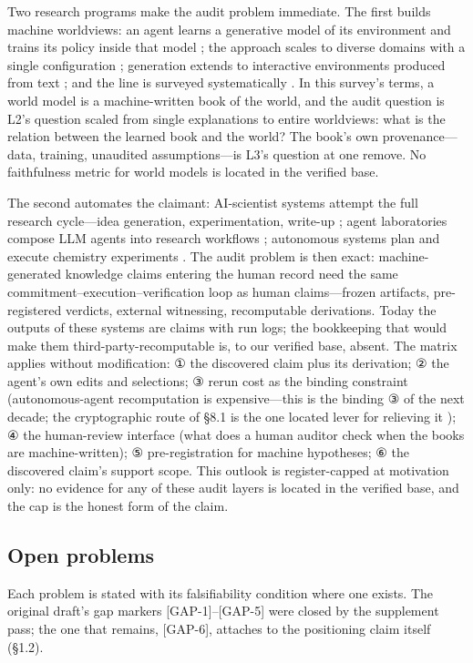 \documentclass[11pt,a4paper]{article}
\begin{document}
Two research programs make the audit problem immediate. The first builds machine worldviews: an agent learns a generative model of its environment and trains its policy inside that model \cite{key49}; the approach scales to diverse domains with a single configuration \cite{key50}; generation extends to interactive environments produced from text \cite{key51}; and the line is surveyed systematically \cite{key52}. In this survey's terms, a world model is a machine-written book of the world, and the audit question is L2's question scaled from single explanations to entire worldviews: what is the relation between the learned book and the world? The book's own provenance—data, training, unaudited assumptions—is L3's question at one remove. No faithfulness metric for world models is located in the verified base.

The second automates the claimant: AI-scientist systems attempt the full research cycle—idea generation, experimentation, write-up \cite{key53}; agent laboratories compose LLM agents into research workflows \cite{key54}; autonomous systems plan and execute chemistry experiments \cite{key55}. The audit problem is then exact: machine-generated knowledge claims entering the human record need the same commitment–execution–verification loop as human claims—frozen artifacts, pre-registered verdicts, external witnessing, recomputable derivations. Today the outputs of these systems are claims with run logs; the bookkeeping that would make them third-party-recomputable is, to our verified base, absent. The matrix applies without modification: ① the discovered claim plus its derivation; ② the agent's own edits and selections; ③ rerun cost as the binding constraint (autonomous-agent recomputation is expensive—this is the binding ③ of the next decade; the cryptographic route of §8.1 is the one located lever for relieving it \cite{key47}); ④ the human-review interface (what does a human auditor check when the books are machine-written); ⑤ pre-registration for machine hypotheses; ⑥ the discovered claim's support scope. This outlook is register-capped at motivation only: no evidence for any of these audit layers is located in the verified base, and the cap is the honest form of the claim.

\subsection{Open problems}

Each problem is stated with its falsifiability condition where one exists. The original draft's gap markers [GAP-1]–[GAP-5] were closed by the supplement pass; the one that remains, [GAP-6], attaches to the positioning claim itself (§1.2).
\end{document}
